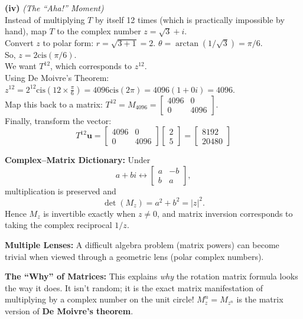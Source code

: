 \begin{solution}
\medskip
\textbf{(iv)} \textit{(The ``Aha!'' Moment)} \\
Instead of multiplying $T$ by itself 12 times (which is practically impossible by hand), map $T$ to the complex number $z = \sqrt{3} + i$. \\
Convert $z$ to polar form: $r = \sqrt{3+1} = 2$. $\theta = \arctan(1/\sqrt{3}) = \pi/6$. \\
So, $z = 2\text{cis}(\pi/6)$. \\
We want $T^{12}$, which corresponds to $z^{12}$. \\
Using De Moivre's Theorem: $z^{12} = 2^{12}\text{cis}\left(12 \times \frac{\pi}{6}\right) = 4096\text{cis}(2\pi) = 4096(1 + 0i) = 4096$. \\
Map this back to a matrix: $T^{12} = M_{4096} = \begin{bmatrix} 4096 & 0 \\ 0 & 4096 \end{bmatrix}$. \\
Finally, transform the vector:
\[
T^{12}\mathbf{u} = \begin{bmatrix} 4096 & 0 \\ 0 & 4096 \end{bmatrix} \begin{bmatrix} 2 \\ 5 \end{bmatrix} = \begin{bmatrix} 8192 \\ 20480 \end{bmatrix}
\]
\end{solution}

\begin{takeaways}
\item \textbf{Complex--Matrix Dictionary:} Under
\[
a+bi\longleftrightarrow
\begin{bmatrix}a&-b\\b&a\end{bmatrix},
\]
multiplication is preserved and
\[
\det(M_z)=a^2+b^2=|z|^2.
\]
Hence $M_z$ is invertible exactly when $z\neq0$, and matrix inversion corresponds to taking the complex reciprocal $1/z$.
\item \textbf{Multiple Lenses:} A difficult algebra problem (matrix powers) can become trivial when viewed through a geometric lens (polar complex numbers). 
\item \textbf{The ``Why'' of Matrices:} This explains \textit{why} the rotation matrix formula looks the way it does. It isn't random; it is the exact matrix manifestation of multiplying by a complex number on the unit circle! $M_z^n=M_{z^n}$ is the matrix version of \textbf{De Moivre's theorem}.
\end{takeaways}

